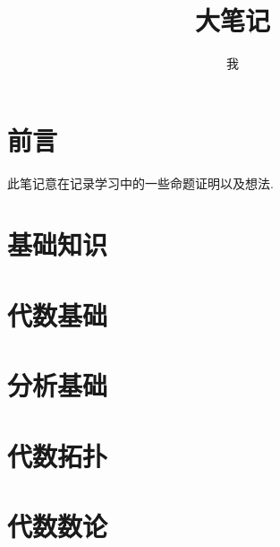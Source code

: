 \documentclass{BigNote}
\title{大笔记}
\author{我}
\begin{document}
    \maketitle

    \tableofcontents
    \newpage

    \chapter*{前言}
    
    此笔记意在记录学习中的一些命题证明以及想法.

    \chapter{基础知识}
    
    
    
    
    
    

    \chapter{代数基础}
    \chapter{分析基础}
    \chapter{代数拓扑}
    
    \chapter{代数数论}



    \printbibliography[heading=bibintoc]
\end{document}
